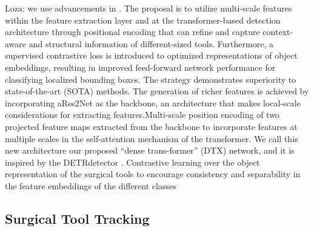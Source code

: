 Loza: we use advancements in \cite{Loza2023DTx}. The proposal is to utilize multi-scale features within the feature extraction layer and at the transformer-based detection architecture through positional encoding that can reﬁne and capture context-aware and structural information of different-sized tools. Furthermore, a supervised contrastive loss is introduced to optimized representations of object embeddings, resulting in improved feed-forward network performance for classifying localized bounding boxes. The strategy demonstrates superiority to state-of-the-art (SOTA) methods. The generation of richer features is achieved by incorporating aRes2Net 
as the backbone, an architecture that makes local-scale considerations for extracting features.Multi-scale position encoding of two projected feature maps extracted from the backbone to incorporate features at multiple scales in the self-attention mechanism of the transformer. We call this new architecture our proposed “dense trans-former” (DTX) network, and it is inspired by the DETRdetector \cite{vedaldi_end--end_2020}. Contrastive learning over the object representation of the surgical tools to encourage consistency and separability in the feature embeddings of the different classes

\subsection{Surgical Tool Tracking}

